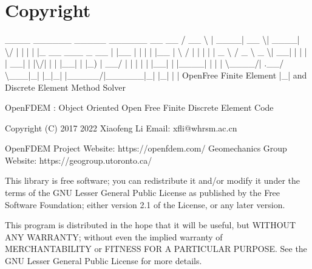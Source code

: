\documentclass[letterpaper,10pt,english]{sphinxmanual}
\begin{document}
\chapter{Copyright}
\label{\detokenize{rst_about_project/copyrights:copyright}}\label{\detokenize{rst_about_project/copyrights::doc}}\begin{sphinxalltt}
              \_\_\_\_                   \_\_\_\_\_\_ \_\_\_\_\_  \_\_\_\_\_\_ \_\_  \_\_                     
             / \_\_ \textbackslash{}                 |  \_\_\_\_|  \_\_ \textbackslash{}|  \_\_\_\_|  \textbackslash{}/  |                    
            | |  | |\_ \_\_   \_\_\_ \_ \_\_ | |\_\_  | |  | | |\_\_  | \textbackslash{}  / |                    
            | |  | | \textquotesingle{}\_ \textbackslash{} / \_ \textbackslash{} \textquotesingle{}\_ \textbackslash{}|  \_\_| | |  | |  \_\_| | |\textbackslash{}/| |                    
            | |\_\_| | |\_) |  \_\_/ | | | |    | |\_\_| | |\_\_\_\_| |  | |                    
             \textbackslash{}\_\_\_\_/| .\_\_/ \textbackslash{}\_\_\_|\_| |\_|\_|    |\_\_\_\_\_/|\_\_\_\_\_\_|\_|  |\_|                    
                   | |                     OpenFree Finite Element                   
                   |\_|                         and Discrete Element Method Solver    
                                                                                     
        OpenFDEM : Object Oriented Open Free Finite Discrete Element Code   
                                                                                     

            Copyright (C) 2017 \sphinxhyphen{} 2022   Xiaofeng Li                                  
                         Email: xfli@whrsm.ac.cn                                     
                                                                                     
     OpenFDEM Project Website: https://openfdem.com/
         Geomechanics Group Website: https://geogroup.utoronto.ca/
         
     This library is free software; you can redistribute it and/or                   
     modify it under the terms of the GNU Lesser General Public                      
     License as published by the Free Software Foundation; either                    
     version 2.1 of the License, or any later version.              
                                                                                     
     This program is distributed in the hope that it will be useful,                 
     but WITHOUT ANY WARRANTY; without even the implied warranty of                  
     MERCHANTABILITY or FITNESS FOR A PARTICULAR PURPOSE.  See the GNU               
     Lesser General Public License for more details.  
\end{sphinxalltt}
\end{document}
